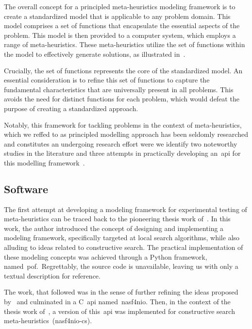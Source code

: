 The overall concept for a principled meta-heuristics modeling framework is to
create a standardized model that is applicable to any problem domain. This model
comprises a set of functions that encapsulate the essential aspects of the
problem. This model is then provided to a computer system, which employs a range
of meta-heuristics. These meta-heuristics utilize the set of functions within
the model to effectively generate solutions, as illustrated in~.

Crucially, the set of functions represents the core of the standardized model.
An essential consideration is to refine this set of functions to capture the
fundamental characteristics that are universally present in all problems. This
avoids the need for distinct functions for each problem, which would defeat the
purpose of creating a standardized approach.

Notably, this framework for tackling problems in the context of meta-heuristics,
which we reffed to as principled modelling approach has been seldomly researched
and constitutes an undergoing research effort were we identify two noteworthy
studies in the literature and three attempts in practically developing
an~\acrfull{api} for this modelling framework~\cite{vieira2009uma,outeiro2021application,fonseca2021nasf4nio}.

\subsection{Software}

The first attempt at developing a modeling framework for experimental testing of
meta-heuristics can be traced back to the pioneering thesis work
of~\citet{vieira2009uma}. In this work, the author introduced the concept of
designing and implementing a modeling framework, specifically targeted at local
search algorithms, while also alluding to ideas related to constructive search.
The practical implementation of these modeling concepts was achieved through a
Python framework, named~\acrfull{pof}.~Regrettably, the source code is
unavailable, leaving us with only a textual description for reference.

The work, that followed was in the sense of further refining the ideas proposed
by~\citet{vieira2009uma} and culminated in a C~\acrshort{api}
named~\acrfull{nasf4nio}. Then, in the context of the thesis work
of~\citet{outeiro2021application}, a version of this~\acrshort{api} was
implemented for constructive search meta-heuristics~(\acrshort{nasf4nio-cs}).


